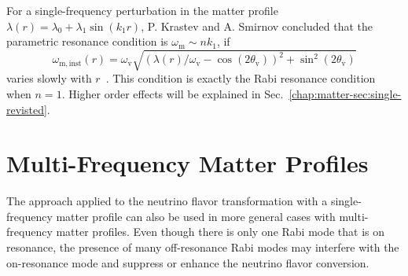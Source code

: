 
For a single-frequency perturbation in the matter profile $\lambda(r) =\lambda_0 +  \lambda_1\sin(k_1 r)$, P. Krastev and A. Smirnov concluded that the parametric resonance condition is $\omega_{\mathrm{m}} \sim n k_1$, if
\begin{equation}
    \omega_{\mathrm{m,inst}}(r) = \omega_{\mathrm{v}} \sqrt{ ( \lambda(r)/\omega_{\mathrm{v}} - \cos (2\theta_{\mathrm{v}}) )^2 + \sin^2(2\theta_{\mathrm{v}}) }
\end{equation}
varies slowly with $r$~\cite{Krastev1989}. This condition is exactly the Rabi resonance condition when $n=1$. Higher order effects will be explained in Sec.~\ref{chap:matter-sec:single-revisted}.





\section{\label{chap:matter-sec:multiple-matter-frequencies}Multi-Frequency Matter Profiles}


The approach applied to the neutrino flavor transformation with a single-frequency matter profile can also be used in more general cases with multi-frequency matter profiles. Even though there is only one Rabi mode that is on resonance, the presence of many off-resonance Rabi modes may interfere with the on-resonance mode and suppress or enhance the neutrino flavor conversion. 

